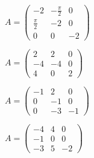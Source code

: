 \begin{multicols}{3}
\begin{enumtasks}
			\item \( A = \begin{pmatrix} -2 & -\frac{\pi}{2} & 0 \\ \frac{\pi}{2} & -2 & 0 \\ 0 & 0 & -2 \end{pmatrix} \) %
			
			\label{linsys_funcs:exponential_general}
			\item \( A = \begin{pmatrix} 2 & 2 & 0 \\ -4 & -4 & 0 \\ 4 & 0 & 2 \end{pmatrix} \) %
			\item \( A = \begin{pmatrix} -1 & 2 & 0 \\ 0 & -1 & 0 \\ 0 & -3 & -1 \end{pmatrix} \) %
			\item \( A = \begin{pmatrix} -4 & 4 & 0 \\ -1 & 0 & 0 \\ -3 & 5 & -2 \end{pmatrix} \) %

\end{enumtasks}
\end{multicols}
